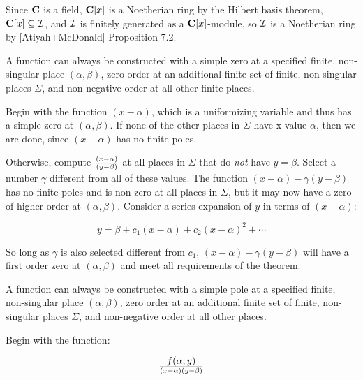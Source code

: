 \proof

Since ${\bf C}$ is a field, ${\bf C}[x]$ is a Noetherian ring by the
Hilbert basis theorem, ${\bf C}[x] \subseteq {\cal I}$, and ${\cal I}$ is
finitely generated as a ${\bf C}[x]$-module, so ${\cal I}$ is a
Noetherian ring by [Atiyah+McDonald] Proposition 7.2.

\endtheorem

\theorem
\label{simple zero construction}

A function can always be constructed with a simple zero at a specified
finite, non-singular place $(\alpha, \beta)$, zero order at an
additional finite set of finite, non-singular places $\Sigma$, and
non-negative order at all other finite places.

\proof

Begin with the function $(x-\alpha)$, which is a uniformizing variable
and thus has a simple zero at $(\alpha, \beta)$.  If none of the other
places in $\Sigma$ have x-value $\alpha$, then we are done, since
$(x-\alpha)$ has no finite poles.

Otherwise, compute $(x-\alpha)\over(y-\beta)$ at all places in
$\Sigma$ that do {\it not} have $y = \beta$.  Select a number
$\gamma$ different from all of these values.  The function $(x-\alpha)
- \gamma (y-\beta)$ has no finite poles and
is non-zero at all places in $\Sigma$, but it may now have a zero of
higher order at $(\alpha, \beta)$.  Consider a series expansion
of $y$ in terms of $(x-\alpha)$:

$$y = \beta + c_1 (x-\alpha) + c_2 (x-\alpha)^2 + \cdots$$

So long as $\gamma$ is also selected different from $c_1$, $(x-\alpha)
- \gamma (y-\beta)$ will have a first order zero at $(\alpha, \beta)$
and meet all requirements of the theorem.


\endtheorem

\vfill\eject

\theorem
\label{simple pole construction}

A function can always be constructed with a simple pole at a specified
finite, non-singular place $(\alpha, \beta)$, zero order at an
additional finite set of finite, non-singular places $\Sigma$, and
non-negative order at all other places.

\proof

Begin with the function:

$$f(\alpha,y)\over(x-\alpha)(y-\beta)$$

